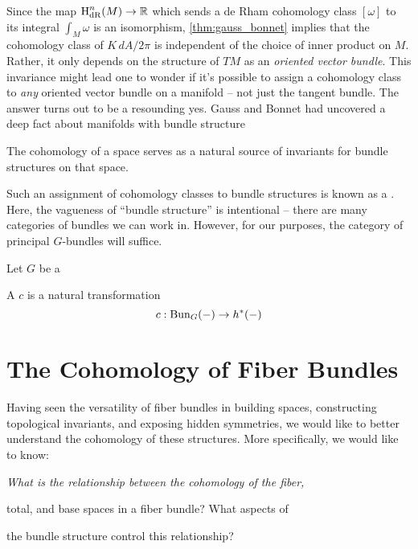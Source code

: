 Since the map $\operatorname{H}_{\operatorname{dR}}^n(M) \to \mathbb{R}$ which sends a de Rham cohomology class $[\omega]$ to its integral $\int_M \omega$ is an isomorphism, \cref{thm:gauss_bonnet} implies that the cohomology class of $K\,dA/2\pi$ is independent of the choice of inner product on $M$. Rather, it only depends on the structure of $TM$ as an \emph{oriented vector bundle}.
This invariance might lead one to wonder if it's possible to assign a cohomology class to \emph{any} oriented vector bundle on a manifold -- not just the tangent bundle. The answer turns out to be a resounding yes. Gauss and Bonnet had uncovered a deep fact about manifolds with bundle structure

\begin{insight}
The cohomology of a space serves as a natural source of invariants for bundle structures on that space. \end{insight}

Such an assignment of cohomology classes to bundle structures is known as a . Here, the vagueness of ``bundle structure'' is intentional -- there are many categories of bundles we can work in. However, for our purposes, the category of principal $G$-bundles will suffice.

\begin{definition}
  Let $G$ be a 

  A  $c$ is a natural transformation
  \[
    c : \operatorname{Bun}_G(-) \to h^*(-)
  \]
\end{definition}

\section{The Cohomology of Fiber Bundles}


Having seen the versatility of fiber bundles in building spaces, constructing topological invariants, and exposing hidden symmetries, we would like to better understand the cohomology of these structures. More specifically, we would like to know:

\begin{center}
	\slshape
	What is the relationship between the cohomology of the fiber,

	total, and base spaces in a fiber bundle? What aspects of

	the bundle structure control this relationship?
\end{center}

